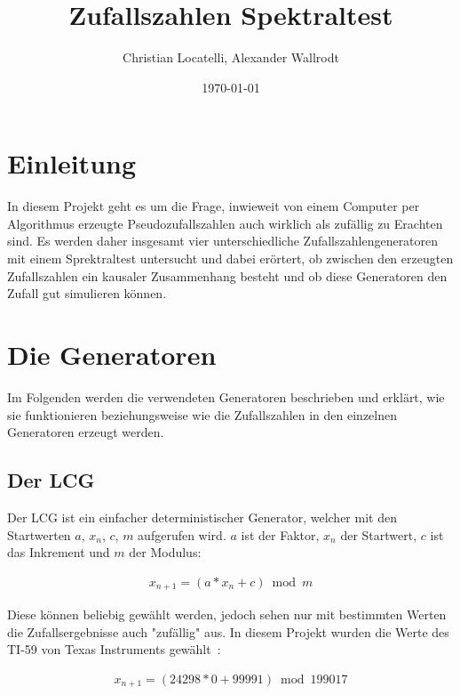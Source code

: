 \documentclass[12pt]{article}
\title{\textbf{Zufallszahlen Spektraltest}}
\author{Christian Locatelli, Alexander Wallrodt}
\date{\today}
\begin{document}
    \maketitle
    \clearpage

    \tableofcontents
    \listoftables
    \listoffigures

    \clearpage


    \section{Einleitung}\label{sec:Einleitung}
    In diesem Projekt geht es um die Frage, inwieweit von einem Computer per Algorithmus erzeugte Pseudozufallszahlen
    auch wirklich als zufällig zu Erachten sind.
    Es werden daher insgesamt vier unterschiedliche Zufallszahlengeneratoren mit einem Sprektraltest untersucht und dabei erörtert,
    ob zwischen den erzeugten Zufallszahlen ein kausaler Zusammenhang besteht
    und ob diese Generatoren den Zufall gut simulieren können.

    \section{Die Generatoren}\label{sec:die-generatoren}
    Im Folgenden werden die verwendeten Generatoren beschrieben und erklärt, wie sie funktionieren beziehungsweise wie
    die Zufallszahlen in den einzelnen Generatoren erzeugt werden.

    \subsection{Der LCG}\label{subsec:der-lcg}
    Der LCG ist ein einfacher deterministischer Generator, welcher mit den Startwerten $a$, $x_n$, $c$, $m$ aufgerufen wird.
    $a$ ist der Faktor, $x_n$ der Startwert, $c$ ist das Inkrement und $m$ der Modulus:

    \begin{align*}
    x_{n+1} = (a * x_n + c) \bmod m
    \end{align*}

    \noindent
    Diese können beliebig gewählt werden, jedoch sehen nur mit bestimmten Werten die Zufallsergebnisse auch "zufällig" aus.
    In diesem Projekt wurden die Werte des TI-59 von Texas Instruments gewählt~\cite{lcg}:

    \begin{align*}
    x_{n+1} = (24298 * 0 + 99991) \bmod 199017
    \end{align*}
\end{document}
